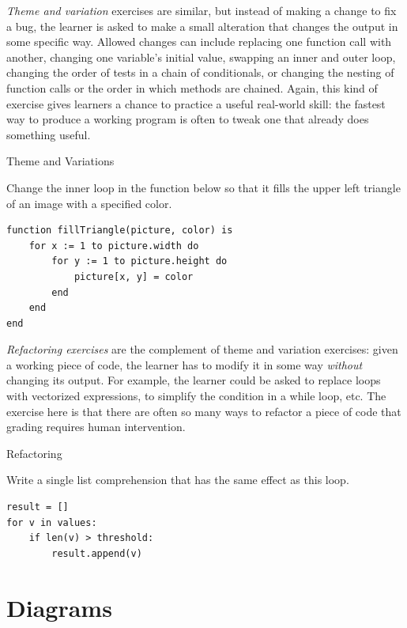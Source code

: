 \emph{Theme and variation} exercises are similar, but instead of making a
change to fix a bug, the learner is asked to make a small alteration
that changes the output in some specific way. Allowed changes can
include replacing one function call with another, changing one
variable's initial value, swapping an inner and outer loop, changing
the order of tests in a chain of conditionals, or changing the nesting
of function calls or the order in which methods are chained. Again, this
kind of exercise gives learners a chance to practice a useful real-world
skill: the fastest way to produce a working program is often to tweak
one that already does something useful.

\begin{aside}{Theme and Variations}

Change the inner loop in the function below so that it fills the upper
left triangle of an image with a specified color.

\begin{verbatim}
function fillTriangle(picture, color) is
    for x := 1 to picture.width do
        for y := 1 to picture.height do
            picture[x, y] = color
        end
    end
end
\end{verbatim}

\end{aside}

\emph{Refactoring exercises} are the complement of theme and variation
exercises: given a working piece of code, the learner has to modify it
in some way \emph{without} changing its output. For example, the learner
could be asked to replace loops with vectorized expressions, to simplify
the condition in a while loop, etc. The exercise here is that there are
often so many ways to refactor a piece of code that grading requires
human intervention.

\begin{aside}{Refactoring}

Write a single list comprehension that has the same effect as this
loop.

\begin{verbatim}
result = []
for v in values:
    if len(v) > threshold:
        result.append(v)
\end{verbatim}

\end{aside}

\section{Diagrams}\label{s:exercises-diagrams}

